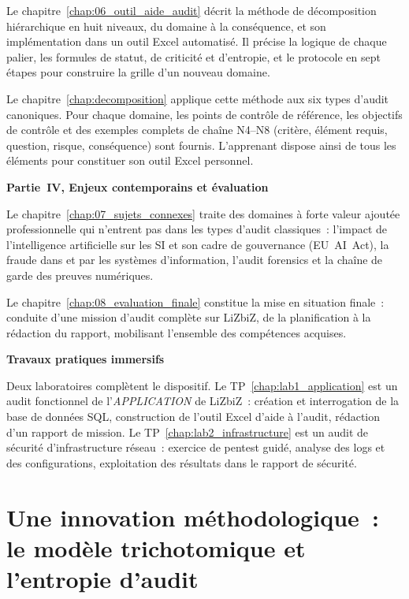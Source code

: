 Le chapitre~\ref{chap:06_outil_aide_audit} décrit la méthode de décomposition hiérarchique en huit niveaux, du domaine à la conséquence, et son implémentation dans un outil Excel automatisé. Il précise la logique de chaque palier, les formules de statut, de criticité et d'entropie, et le protocole en sept étapes pour construire la grille d'un nouveau domaine.

Le chapitre~\ref{chap:decomposition} applique cette méthode aux six types d'audit canoniques. Pour chaque domaine, les points de contrôle de référence, les objectifs de contrôle et des exemples complets de chaîne N4--N8 (critère, élément requis, question, risque, conséquence) sont fournis. L'apprenant dispose ainsi de tous les éléments pour constituer son outil Excel personnel.

\medskip
\noindent\textbf{Partie~IV, Enjeux contemporains et évaluation}

Le chapitre~\ref{chap:07_sujets_connexes} traite des domaines à forte valeur ajoutée professionnelle qui n'entrent pas dans les types d'audit classiques~: l'impact de l'intelligence artificielle sur les SI et son cadre de gouvernance (EU~AI~Act), la fraude dans et par les systèmes d'information, l'audit forensics et la chaîne de garde des preuves numériques.

Le chapitre~\ref{chap:08_evaluation_finale} constitue la mise en situation finale~: conduite d'une mission d'audit complète sur LiZbiZ, de la planification à la rédaction du rapport, mobilisant l'ensemble des compétences acquises.

\medskip
\noindent\textbf{Travaux pratiques immersifs}

Deux laboratoires complètent le dispositif. Le TP~\ref{chap:lab1_application} est un audit fonctionnel de l'\textit{APPLICATION} de LiZbiZ~: création et interrogation de la base de données SQL, construction de l'outil Excel d'aide à l'audit, rédaction d'un rapport de mission. Le TP~\ref{chap:lab2_infrastructure} est un audit de sécurité d'infrastructure réseau~: exercice de pentest guidé, analyse des logs et des configurations, exploitation des résultats dans le rapport de sécurité.

\section*{Une innovation méthodologique~: le modèle trichotomique et l'entropie d'audit}

